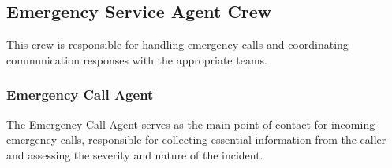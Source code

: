 \subsection{Emergency Service Agent Crew}

This crew is responsible for handling emergency calls and coordinating communication responses with the appropriate teams.

\subsubsection{Emergency Call Agent}

The Emergency Call Agent serves as the main point of contact for incoming emergency calls, responsible for collecting essential information from the caller and assessing the severity and nature of the incident.


